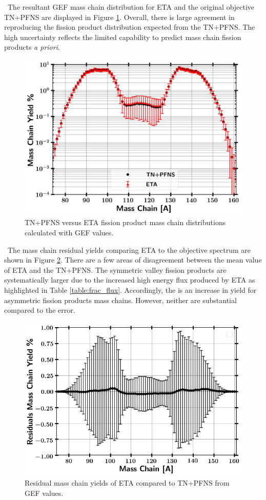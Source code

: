\ The resultant GEF mass chain distribution for ETA and the original objective TN+PFNS are displayed in Figure \ref{fig:fp2}. 
Overall, there is large agreement in reproducing the fission product distribution expected from the TN+PFNS.
The high uncertainty reflects the limited capability to predict mass chain fission products \textit{a priori}. 

\begin{figure}[!htbp]
	\centering
	\includegraphics[width=13cm]{Figures/Chapter4/FPs/ETA_vs_TNPFNS_FPs.png}
	\caption{TN+PFNS versus ETA fission product mass chain distributions calculated with GEF values.}
	\label{fig:fp2}
\end{figure}

\ The mass chain residual yields comparing ETA to the objective spectrum are shown in Figure \ref{fig:fp3}. 
There are a few areas of disagreement between the mean value of ETA and the TN+PFNS. 
The symmetric valley fission products are systematically larger due to the increased high energy flux produced by ETA as highlighted in Table \ref{table:frac_flux}. 
Accordingly, the is an increase in yield for asymmetric fission products mass chains.
However, neither are substantial compared to the error. 

\begin{figure}[!htbp]
	\centering
	\includegraphics[width=13cm]{Figures/Chapter4/FPs/Residuals_Obj_minus_ETA.png}
	\caption{Residual mass chain yields of ETA compared to TN+PFNS from GEF values.}
	\label{fig:fp3}
\end{figure}

